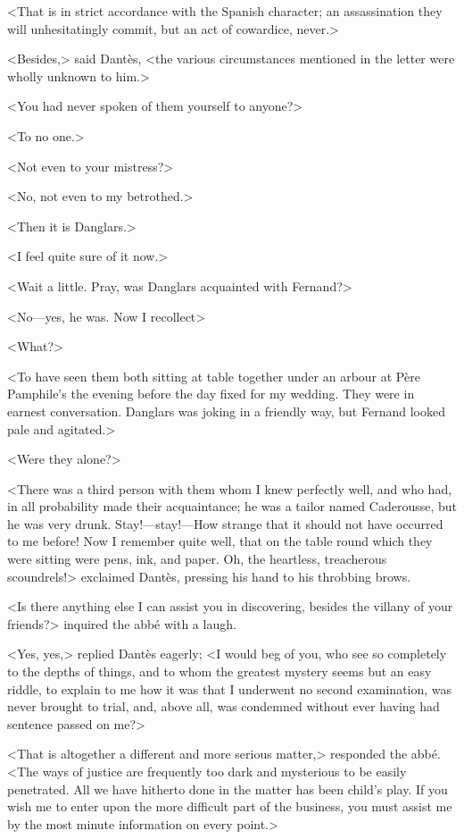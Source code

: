  <That is in strict accordance with the Spanish character; an assassination they will unhesitatingly commit, but an act of cowardice, never.> 

 <Besides,> said Dantès, <the various circumstances mentioned in the letter were wholly unknown to him.> 

 <You had never spoken of them yourself to anyone?> 

 <To no one.> 

 <Not even to your mistress?> 

 <No, not even to my betrothed.> 

 <Then it is Danglars.> 

 <I feel quite sure of it now.> 

 <Wait a little. Pray, was Danglars acquainted with Fernand?> 

 <No—yes, he was. Now I recollect\longdash> 

 <What?> 

 <To have seen them both sitting at table together under an arbour at Père Pamphile's the evening before the day fixed for my wedding. They were in earnest conversation. Danglars was joking in a friendly way, but Fernand looked pale and agitated.> 

 <Were they alone?> 

 <There was a third person with them whom I knew perfectly well, and who had, in all probability made their acquaintance; he was a tailor named Caderousse, but he was very drunk. Stay!—stay!—How strange that it should not have occurred to me before! Now I remember quite well, that on the table round which they were sitting were pens, ink, and paper. Oh, the heartless, treacherous scoundrels!> exclaimed Dantès, pressing his hand to his throbbing brows. 

 <Is there anything else I can assist you in discovering, besides the villany of your friends?> inquired the abbé with a laugh. 

 <Yes, yes,> replied Dantès eagerly; <I would beg of you, who see so completely to the depths of things, and to whom the greatest mystery seems but an easy riddle, to explain to me how it was that I underwent no second examination, was never brought to trial, and, above all, was condemned without ever having had sentence passed on me?> 

 <That is altogether a different and more serious matter,> responded the abbé. <The ways of justice are frequently too dark and mysterious to be easily penetrated. All we have hitherto done in the matter has been child's play. If you wish me to enter upon the more difficult part of the business, you must assist me by the most minute information on every point.> 

